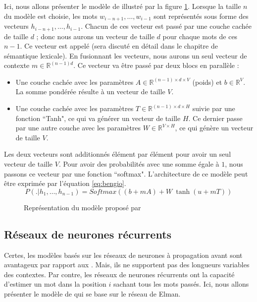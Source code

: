 \documentclass{KodeBook}
\begin{document}
Ici, nous allons présenter le modèle de \citet{2003-bengio-al} illustré par la figure \ref{fig:bengio-l}.
Lorsque la taille $n$ du modèle est choisie, les mots $w_{i-n+1}, \ldots, w_{i-1}$ sont représentés sous forme des vecteurs  $h_{i-n+1}, \ldots, h_{i-1}$. 
Chacun de ces vecteur est passé par une couche cachée de taille $d$ ; donc nous aurons un vecteur de taille $d$ pour chaque mots de ces $n-1$.
Ce vecteur est appelé  (sera discuté en détail dans le chapitre de sémantique lexicale). 
En fusionnant les vecteurs, nous aurons un seul vecteur de contexte $m \in \mathbb{R}^{(n-1) d}$.
Ce vecteur va être passé par deux blocs en parallèle :
\begin{itemize}
	\item Une couche cachée avec les paramètres $A \in \mathbb{R}^{(n-1) \times d \times V}$ (poids) et $b \in \mathbb{R}^{V}$. 
	La somme pondérée résulte à un vecteur de taille $V$. 
	\item Une couche cachée avec les paramètres $T \in \mathbb{R}^{(n-1) \times d \times H}$ suivie par une fonction ``Tanh", ce qui va générer un vecteur de taille $H$. 
	Ce dernier passe par une autre couche avec les paramètres $W \in \mathbb{R}^{V \times H}$, ce qui génère un vecteur de taille $V$. 
\end{itemize}
Les deux vecteurs sont additionnés élément par élément pour avoir un seul vecteur de taille $V$. 
Pour avoir des probabilités avec une somme égale à $1$, nous passons ce vecteur par une fonction ``softmax". 
L'architecture de ce modèle peut être exprimée par l'équation \ref{eq:bengio}.
\begin{equation}
	P(.|h_1,\ldots, h_{n-1}) = 
	Softmax \left(
	(b + m A) 
	+ 
	W\ \tanh(u + m T)
	\right)
	\label{eq:bengio}
\end{equation}

\begin{figure}[ht]
	\centering
	\caption[Modèle de langage à base des réseaux de neurones à propagation avant]{Représentation du modèle proposé par \citet{2003-bengio-al}\label{fig:bengio-l}}
\end{figure}

\subsection{Réseaux de neurones récurrents}

Certes, les modèles basés sur les réseaux de neurones à propagation avant sont avantageux par rapport aux .
Mais, ils ne supportent pas des longueurs variables des contextes.
Par contre, les réseaux de neurones récurrents ont la capacité d'estimer un mot dans la position $i$ sachant tous les mots passés.
Ici, nous allons présenter le modèle de \citet{2010-mokolov-al} qui se base sur le réseau de Elman.
\end{document}
